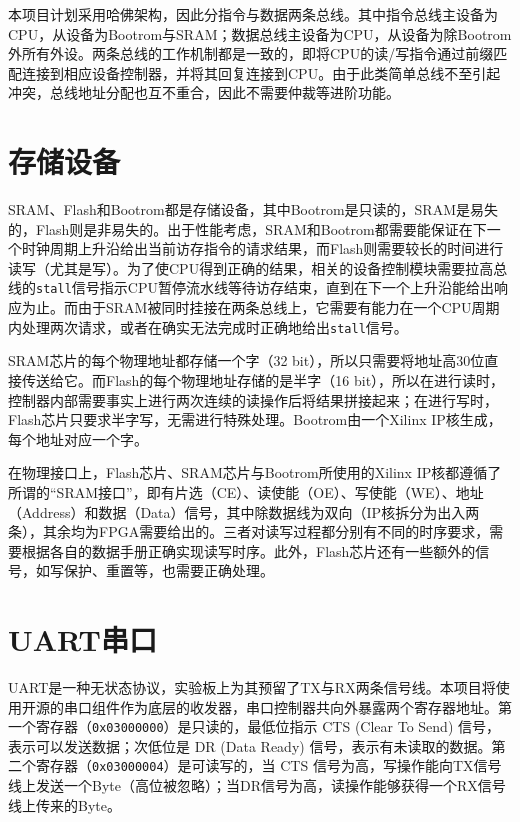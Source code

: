 本项目计划采用哈佛架构，因此分指令与数据两条总线。其中指令总线主设备为CPU，从设备为Bootrom与SRAM；数据总线主设备为CPU，从设备为除Bootrom外所有外设。两条总线的工作机制都是一致的，即将CPU的读/写指令通过前缀匹配连接到相应设备控制器，并将其回复连接到CPU。由于此类简单总线不至引起冲突，总线地址分配也互不重合，因此不需要仲裁等进阶功能。

\section{存储设备}

SRAM、Flash和Bootrom都是存储设备，其中Bootrom是只读的，SRAM是易失的，Flash则是非易失的。出于性能考虑，SRAM和Bootrom都需要能保证在下一个时钟周期上升沿给出当前访存指令的请求结果，而Flash则需要较长的时间进行读写（尤其是写）。为了使CPU得到正确的结果，相关的设备控制模块需要拉高总线的\texttt{stall}信号指示CPU暂停流水线等待访存结束，直到在下一个上升沿能给出响应为止。而由于SRAM被同时挂接在两条总线上，它需要有能力在一个CPU周期内处理两次请求，或者在确实无法完成时正确地给出\texttt{stall}信号。

SRAM芯片的每个物理地址都存储一个字（32 bit），所以只需要将地址高30位直接传送给它。而Flash的每个物理地址存储的是半字（16 bit），所以在进行读时，控制器内部需要事实上进行两次连续的读操作后将结果拼接起来；在进行写时，Flash芯片只要求半字写，无需进行特殊处理。Bootrom由一个Xilinx IP核生成，每个地址对应一个字。

在物理接口上，Flash芯片、SRAM芯片与Bootrom所使用的Xilinx IP核都遵循了所谓的“SRAM接口”，即有片选（CE）、读使能（OE）、写使能（WE）、地址（Address）和数据（Data）信号，其中除数据线为双向（IP核拆分为出入两条），其余均为FPGA需要给出的。三者对读写过程都分别有不同的时序要求，需要根据各自的数据手册正确实现读写时序。此外，Flash芯片还有一些额外的信号，如写保护、重置等，也需要正确处理。

\section{UART串口}

UART是一种无状态协议，实验板上为其预留了TX与RX两条信号线。本项目将使用开源的串口组件作为底层的收发器，串口控制器共向外暴露两个寄存器地址。第一个寄存器（\texttt{0x03000000}）是只读的，最低位指示 CTS (Clear To Send) 信号，表示可以发送数据；次低位是 DR (Data Ready) 信号，表示有未读取的数据。第二个寄存器（\texttt{0x03000004}）是可读写的，当 CTS 信号为高，写操作能向TX信号线上发送一个Byte（高位被忽略）；当DR信号为高，读操作能够获得一个RX信号线上传来的Byte。


